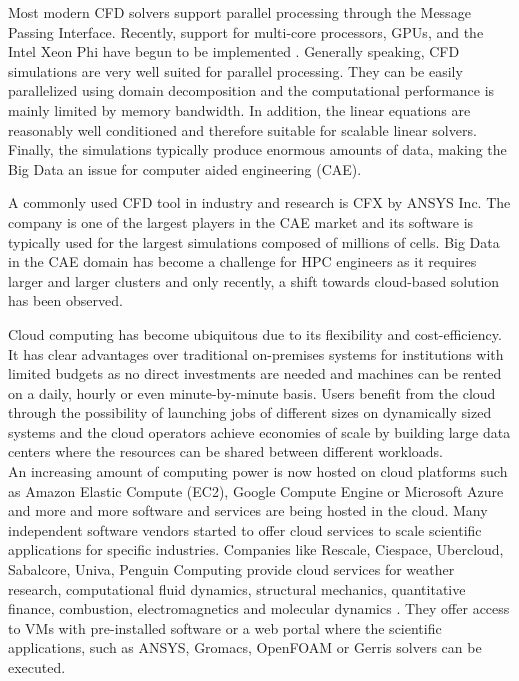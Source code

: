 \documentclass[a4paper,twoside]{article}
\begin{document}
Most modern CFD solvers support parallel processing through the Message Passing Interface. Recently, support for multi-core processors, GPUs, and the Intel Xeon Phi have begun to be implemented \cite{tomczak2013} \cite{Che09042015}. Generally speaking, CFD simulations are very well suited for parallel processing. They can be easily parallelized using domain decomposition and the computational performance is mainly limited by memory bandwidth. In addition, the linear equations are reasonably well conditioned and therefore suitable for scalable linear solvers. Finally, the simulations typically produce enormous amounts of data, making the Big Data an issue for computer aided engineering (CAE).

A commonly used CFD tool in industry and research is CFX by ANSYS Inc. The company is one of the largest players in the CAE market \cite{mcae2012} and its software is typically used for the largest simulations composed of millions of cells. Big Data in the CAE domain has become a challenge for HPC engineers as it requires larger and larger clusters and only recently, a shift towards cloud-based solution has been observed.

Cloud computing has become ubiquitous due to its flexibility and cost-efficiency. It has clear advantages over traditional on-premises systems for institutions with limited budgets as no direct investments are needed and machines can be rented on a daily, hourly or even minute-by-minute basis. Users benefit from the cloud through the possibility of launching jobs of different sizes on dynamically sized systems and the cloud operators achieve economies of scale by building large data centers where the resources can be shared between different workloads. \\
An increasing amount of computing power is now hosted on cloud platforms such as Amazon Elastic Compute (EC2), Google Compute Engine or Microsoft Azure and more and more software and services are being hosted in the cloud. Many independent software vendors started to offer cloud services to scale scientific applications for specific industries. Companies like Rescale, Ciespace, Ubercloud, Sabalcore, Univa, Penguin Computing provide cloud services for weather research, computational fluid dynamics, structural mechanics, quantitative finance, combustion, electromagnetics and molecular dynamics \cite{ubercloud}. They offer access to VMs with pre-installed software or a web portal where the scientific applications, such as ANSYS, Gromacs, OpenFOAM or Gerris solvers \cite{Popinet2003} can be executed.
\end{document}
